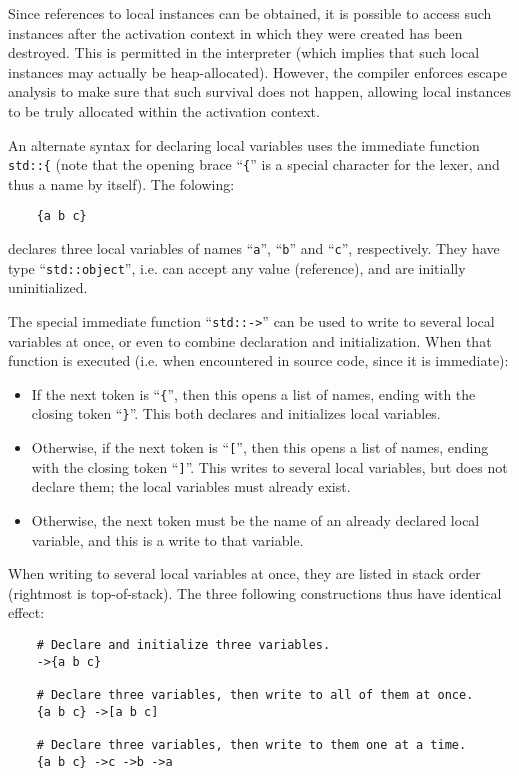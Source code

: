 Since references to local instances can be obtained, it is possible to
access such instances after the activation context in which they were
created has been destroyed. This is permitted in the interpreter (which
implies that such local instances may actually be heap-allocated).
However, the compiler enforces escape analysis to make sure that such
survival does not happen, allowing local instances to be truly allocated
within the activation context.

An alternate syntax for declaring local variables uses the immediate
function \verb|std::{| (note that the opening brace ``\verb|{|'' is a
special character for the lexer, and thus a name by itself). The
folowing:
\begin{verbatim}
    {a b c}
\end{verbatim}
declares three local variables of names ``\verb|a|'', ``\verb|b|'' and
``\verb|c|'', respectively. They have type ``\verb|std::object|'', i.e.
can accept any value (reference), and are initially uninitialized.

The special immediate function ``\verb|std::->|'' can be used to write
to several local variables at once, or even to combine declaration and
initialization. When that function is executed (i.e. when encountered in
source code, since it is immediate):
\begin{itemize}

    \item If the next token is ``\verb|{|'', then this opens a list of
    names, ending with the closing token ``\verb|}|''. This both declares
    and initializes local variables.

    \item Otherwise, if the next token is ``\verb|[|'', then this opens
    a list of names, ending with the closing token ``\verb|]|''. This
    writes to several local variables, but does not declare them; the
    local variables must already exist.

    \item Otherwise, the next token must be the name of an already declared
    local variable, and this is a write to that variable.

\end{itemize}

When writing to several local variables at once, they are listed in
stack order (rightmost is top-of-stack). The three following
constructions thus have identical effect:
\begin{verbatim}
    # Declare and initialize three variables.
    ->{a b c}

    # Declare three variables, then write to all of them at once.
    {a b c} ->[a b c]

    # Declare three variables, then write to them one at a time.
    {a b c} ->c ->b ->a
\end{verbatim}


